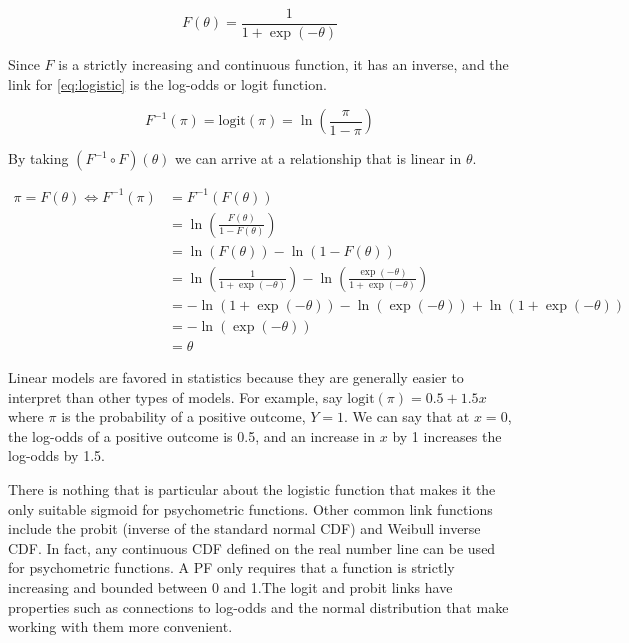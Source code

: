 \documentclass[11pt, oneside, openany]{scrbook}
\begin{document}
\begin{equation}
  F(\theta) = \frac{1}{1 + \exp\left(-\theta\right)}
  \label{eq:logistic}
\end{equation}

Since \(F\) is a strictly increasing and continuous function, it has an inverse, and the link for \eqref{eq:logistic} is the log-odds or logit function.

\begin{equation}
  F^{-1}(\pi) = \mathrm{logit}(\pi) = \ln\left(\frac{\pi}{1 - \pi}\right)
  \label{eq:logit}
\end{equation}

By taking \((F^{-1} \circ F)(\theta)\) we can arrive at a relationship that is linear in \(\theta\).

\begin{align*}
  \pi = F(\theta) \Longleftrightarrow F^{-1}(\pi) &= F^{-1}(F(\theta)) \\
  & = \ln\left(\frac{F(\theta)}{1 - F(\theta)}\right) \\
  &= \ln(F(\theta)) - \ln(1 - F(\theta)) \\
  &= \ln\left(\frac{1}{1 + \exp(-\theta)}\right) - \ln\left(\frac{\exp(-\theta)}{1 + \exp(-\theta)}\right) \\
  &= - \ln(1 + \exp(-\theta)) - \ln(\exp(-\theta)) + \ln(1 + \exp(-\theta)) \\
  &= - \ln(\exp(-\theta)) \\
  &= \theta
\end{align*}

Linear models are favored in statistics because they are generally easier to interpret than other types of models. For example, say \(\mathrm{logit}(\pi) = 0.5 + 1.5x\) where \(\pi\) is the probability of a positive outcome, \(Y=1\). We can say that at \(x = 0\), the log-odds of a positive outcome is 0.5, and an increase in \(x\) by 1 increases the log-odds by 1.5.

There is nothing that is particular about the logistic function that makes it the only suitable sigmoid for psychometric functions. Other common link functions include the probit (inverse of the standard normal CDF) and Weibull inverse CDF. In fact, any continuous CDF defined on the real number line can be used for psychometric functions. A PF only requires that a function is strictly increasing and bounded between 0 and 1.The logit and probit links have properties such as connections to log-odds and the normal distribution that make working with them more convenient.
\end{document}
